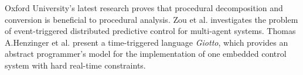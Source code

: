 Oxford University's latest research\cite{david2015using} proves that procedural decomposition and conversion is beneficial to procedural analysis.
Zou et al.\cite{zou2016event} investigates the problem of event-triggered distributed predictive control for multi-agent systems.
Thomas A.Henzinger et al. present a time-triggered language \emph{Giotto}\cite{henzinger2001giotto}, which provides an abstract programmer's model for the implementation of one embedded control system with hard real-time constraints.
